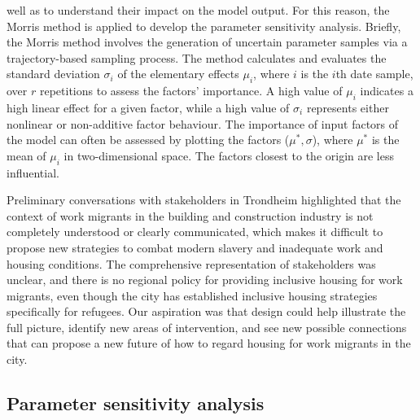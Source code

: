 \documentclass{PDS}%
\theoremstyle{definition}
\begin{document}
well as to understand their impact on the model output. For this reason, the Morris
method \citep{cadero2018global} is applied to develop the parameter sensitivity analysis.
Briefly, the Morris method involves the generation of uncertain parameter samples via a
trajectory-based sampling process. The method calculates and evaluates the standard
deviation $\sigma_i$ of the elementary effects $\mu_i$, where $i$ is the $i${th} date
sample, over $r$ repetitions to assess the factors' importance. A high value of $\mu_i$
indicates a high linear effect for a given factor, while a high value of $\sigma_i$
represents either nonlinear or non-additive factor behaviour. The importance of input
factors of the model can often be assessed by plotting the factors ($\mu^{*},\sigma$),
where $\mu^*$ is the mean of $\mu_i$ in  two-dimensional space. The factors closest to
the origin are less influential.

Preliminary conversations with stakeholders in Trondheim highlighted that the context of work migrants
in the building and construction industry is not completely understood or clearly communicated, which
makes it difficult to propose new strategies to combat modern slavery and inadequate work and housing
conditions. The comprehensive representation of stakeholders was unclear, and there is no regional
policy for providing inclusive housing for work migrants, even though the city has established inclusive
housing strategies specifically for refugees. Our aspiration was that design could help illustrate the full
picture, identify new areas of intervention, and see new possible connections that can propose a new
future of how to regard housing for work migrants in the city.


\subsection{Parameter sensitivity analysis}
\end{document}
